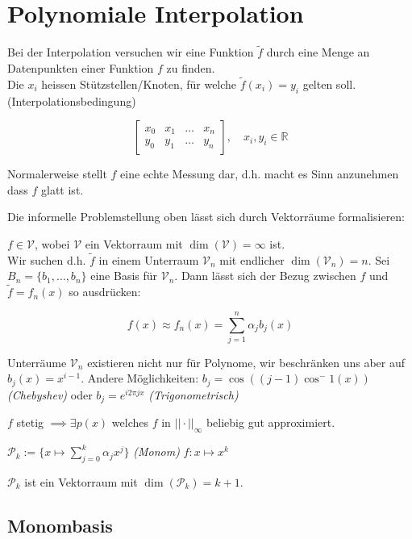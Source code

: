 \newsection
\section{Polynomiale Interpolation}
Bei der Interpolation versuchen wir eine Funktion $\tilde{f}$ durch eine Menge an Datenpunkten einer Funktion $f$ zu finden.\\
Die $x_i$ heissen Stützstellen/Knoten, für welche $\tilde{f}(x_i) = y_i$ gelten soll. (Interpolationsbedingung)

$$ 
\begin{bmatrix}
    x_0 & x_1 & \ldots & x_n \\
    y_0 & y_1 & \ldots & y_n    
\end{bmatrix},
\quad x_i, y_i \in \mathbb{R}
$$

Normalerweise stellt $f$ eine echte Messung dar, d.h. macht es Sinn anzunehmen dass $f$ glatt ist.

Die informelle Problemstellung oben lässt sich durch Vektorräume formalisieren:

$f \in \mathcal{V}$, wobei $\mathcal{V}$ ein Vektorraum mit $\dim(\mathcal{V}) = \infty$ ist. \\
Wir suchen d.h. $\tilde{f}$ in einem Unterraum $\mathcal{V}_n$ mit endlicher $\dim(\mathcal{V}_n) = n$.
Sei $B_n = \{b_1,\ldots,b_n\}$ eine Basis für $\mathcal{V}_n$. 
Dann lässt sich der Bezug zwischen $f$ und $\tilde{f} = f_n(x)$ so ausdrücken:

$$f(x) \approx f_n(x) = \sum_{j=1}^n \alpha_j b_j(x)$$

\setcounter{all}{2}
\inlineremark Unterräume $\mathcal{V}_n$ existieren nicht nur für Polynome, wir beschränken uns aber auf $b_j(x) = x^{i-1}$.
Andere Möglichkeiten: $b_j = \cos((j-1)\cos^-1(x))$ \textit{(Chebyshev)} oder $b_j = e^{i2\pi j x}$ \textit{(Trigonometrisch)}


\setcounter{all}{5}
 $f$ stetig $\implies \exists p(x)$ welches $f$ in $||\cdot||_\infty$ beliebig gut approximiert.

\setcounter{all}{7}
 $\mathcal{P}_k := \{ x \mapsto \sum_{j = 0}^{k} \alpha_j x^j \}$ \inlinedef \textit{(Monom)} $f: x \mapsto x^k$

 $\mathcal{P}_k$ ist ein Vektorraum mit $\dim(\mathcal{P}_k) = k+1$.

\subsection{Monombasis}

